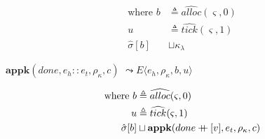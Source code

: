 \documentclass[12pt,draft]{article}
\newcommand\mdoubleplus{\ensuremath{\mathbin{+\mkern-9mu+}}}
\begin{document}
\begin{multicols*}{2}
\begin{align*}
\text{where } b &\triangleq \widehat{alloc}(\varsigma, 0) \\
u &\triangleq \widehat{tick}(\varsigma, 1) \\
\hat{\sigma}[b] &\sqcup \kappa_{\lambda}
\end{align*}
\begin{center}
  $\textbf{appk}(done, e_h::e_t, \rho_\kappa, c)$
  $\leadsto E\langle e_h , \rho_\kappa , b , u \rangle$
\end{center}
\vspace{-7mm}
\begin{align*}
\text{where } b &\triangleq \widehat{alloc}(\varsigma, 0) \\
u &\triangleq \widehat{tick}(\varsigma, 1) \\
\hat{\sigma}[b] &\sqcup \textbf{appk}(done \mdoubleplus [v], e_t , \rho_{\kappa} , c)
\end{align*}
\end{multicols*}
\end{document}
